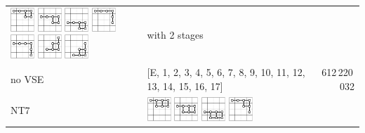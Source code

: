 \documentclass[runningheads]{llncs}
\begin{document}
\begin{tabular}{p{1.2cm}l@{~~}r}
\includegraphics[width=0.9cm]{figures/NTuple-62.pdf}
\includegraphics[width=0.9cm]{figures/NTuple-63.pdf}
\includegraphics[width=0.9cm]{figures/NTuple-64.pdf}
\includegraphics[width=0.9cm]{figures/NTuple-65.pdf}
\includegraphics[width=0.9cm]{figures/NTuple-66.pdf}
\includegraphics[width=0.9cm]{figures/NTuple-67.pdf}
\includegraphics[width=0.9cm]{figures/NTuple-68.pdf}
& with 2 stages \\
no VSE & [E, 1, 2, 3, 4, 5, 6, 7, 8, 9, 10, 11, 12, 13, 14, 15, 16, 17] & 612\,220\,032 \\\hline
\textsf{NT7}
&
\includegraphics[width=0.9cm]{figures/NTuple-70.pdf}
\includegraphics[width=0.9cm]{figures/NTuple-71.pdf}
\includegraphics[width=0.9cm]{figures/NTuple-72.pdf}
\includegraphics[width=0.9cm]{figures/NTuple-73.pdf}

\end{tabular}
\end{document}
